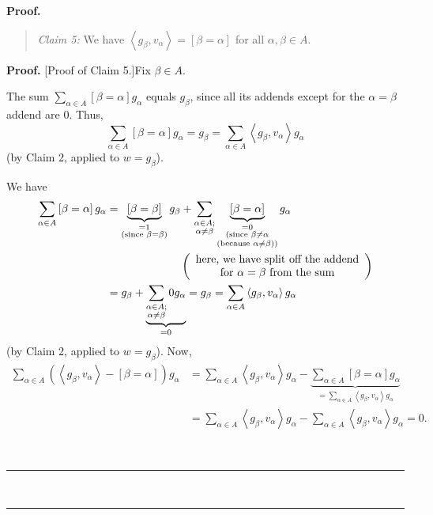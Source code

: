 \documentclass[numbers=enddot,12pt,final,onecolumn,notitlepage]{scrartcl}%
\theoremstyle{definition}
\newenvironment{statement}{\begin{quote}}{\end{quote}}
\newenvironment{proof}[1][Proof]{\noindent\textbf{#1.} }{\ \rule{0.5em}{0.5em}}
\let\sumnonlimits\sum
\renewcommand{\sum}{\sumnonlimits\limits}
\newenvironment{verlong}{}{}
\newenvironment{vershort}{}{}
\begin{document}
\begin{proof}
\begin{statement}
\textit{Claim 5:} We have $\left\langle g_{\beta},v_{\alpha}\right\rangle
=\left[  \beta=\alpha\right]  $ for all $\alpha,\beta\in A$.
\end{statement}

\begin{proof}
[Proof of Claim 5.]Fix $\beta\in A$.

\begin{vershort}
The sum $\sum_{\alpha\in A}\left[  \beta=\alpha\right]  g_{\alpha}$ equals
$g_{\beta}$, since all its addends except for the $\alpha=\beta$ addend are
$0$. Thus,%
\begin{equation}
\sum_{\alpha\in A}\left[  \beta=\alpha\right]  g_{\alpha}=g_{\beta}%
=\sum_{\alpha\in A}\left\langle g_{\beta},v_{\alpha}\right\rangle g_{\alpha}
\label{pf.lem.dual-bases-crit.b.1}%
\end{equation}
(by Claim 2, applied to $w=g_{\beta}$).
\end{vershort}

\begin{verlong}
We have%
\begin{align*}
\sum_{\alpha\in A}\left[  \beta=\alpha\right]  g_{\alpha}  &
=\underbrace{\left[  \beta=\beta\right]  }_{\substack{=1\\\text{(since }%
\beta=\beta\text{)}}}g_{\beta}+\sum_{\substack{\alpha\in A;\\\alpha\neq\beta
}}\underbrace{\left[  \beta=\alpha\right]  }_{\substack{=0\\\text{(since
}\beta\neq\alpha\\\text{(because }\alpha\neq\beta\text{))}}}g_{\alpha}\\
&  \ \ \ \ \ \ \ \ \ \ \ \ \ \ \ \ \ \ \ \ \left(
\begin{array}
[c]{c}%
\text{here, we have split off the addend}\\
\text{for }\alpha=\beta\text{ from the sum}%
\end{array}
\right) \\
&  =g_{\beta}+\underbrace{\sum_{\substack{\alpha\in A;\\\alpha\neq\beta
}}0g_{\alpha}}_{=0}=g_{\beta}=\sum_{\alpha\in A}\left\langle g_{\beta
},v_{\alpha}\right\rangle g_{\alpha}%
\end{align*}
(by Claim 2, applied to $w=g_{\beta}$). Now,%
\begin{align*}
\sum_{\alpha\in A}\left(  \left\langle g_{\beta},v_{\alpha}\right\rangle
-\left[  \beta=\alpha\right]  \right)  g_{\alpha}  &  =\sum_{\alpha\in
A}\left\langle g_{\beta},v_{\alpha}\right\rangle g_{\alpha}-\underbrace{\sum
_{\alpha\in A}\left[  \beta=\alpha\right]  g_{\alpha}}_{=\sum_{\alpha\in
A}\left\langle g_{\beta},v_{\alpha}\right\rangle g_{\alpha}}\\
&  =\sum_{\alpha\in A}\left\langle g_{\beta},v_{\alpha}\right\rangle
g_{\alpha}-\sum_{\alpha\in A}\left\langle g_{\beta},v_{\alpha}\right\rangle
g_{\alpha}=0.
\end{align*}


\end{verlong}
\end{proof}
\end{proof}
\end{document}
